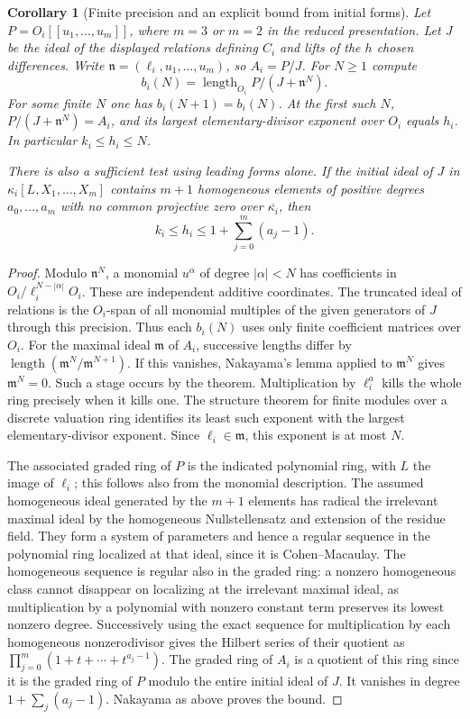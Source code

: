 \documentclass[a4paper,11pt]{article}
\newtheorem{corollary}[proposition]{Corollary}
\theoremstyle{definition}
\theoremstyle{remark}
\numberwithin{equation}{section}
\begin{document}
\begin{corollary}[Finite precision and an explicit bound from initial forms]\leavevmode
\label{cor:jetslength490}
Let \(P=O_i[[u_1,\ldots,u_m]]\), where \(m=3\) or \(m=2\) in
the reduced presentation. Let \(J\) be the ideal of the displayed
relations defining \(C_i\) and lifts of the \(h\) chosen differences.
Write \(\mathfrak n=(\ell_i,u_1,\ldots,u_m)\), so \(A_i=P/J\).
For \(N\ge1\) compute
\[
       b_i(N)=\operatorname{length}_{O_i}P/(J+\mathfrak n^N).
\]
For some finite \(N\) one has \(b_i(N+1)=b_i(N)\).
At the first such \(N\), \(P/(J+\mathfrak n^N)=A_i\), and its
largest elementary-divisor exponent over \(O_i\) equals \(h_i\).
In particular \(k_i\le h_i\le N\).

There is also a sufficient test using leading forms alone. If the
initial ideal of \(J\) in \(\kappa_i[L,X_1,\ldots,X_m]\) contains
\(m+1\) homogeneous elements of positive degrees \(a_0,\ldots,a_m\)
with no common projective zero over \(\overline{\kappa_i}\), then
\[
                  k_i\le h_i\le 1+\sum_{j=0}^m(a_j-1).
\]
\end{corollary}
\begin{proof}
Modulo \(\mathfrak n^N\), a monomial \(u^\alpha\) of degree
\(|\alpha|<N\) has coefficients in \(O_i/\ell_i^{N-|\alpha|}O_i\).
These are independent additive coordinates. The truncated ideal
of relations is the \(O_i\)-span of all monomial multiples of
the given generators of \(J\) through this precision. Thus each
\(b_i(N)\) uses only finite coefficient matrices over \(O_i\).
For the maximal ideal \(\mathfrak m\) of \(A_i\), successive
lengths differ by \(\operatorname{length}(\mathfrak m^N/
\mathfrak m^{N+1})\). If this vanishes, Nakayama's lemma applied to
\(\mathfrak m^N\) gives \(\mathfrak m^N=0\). Such a stage occurs
by the theorem. Multiplication by \(\ell_i^a\) kills the whole ring
precisely when it kills one. The structure theorem for finite
modules over a discrete valuation ring identifies its least such
exponent with the largest elementary-divisor exponent. Since
\(\ell_i\in\mathfrak m\), this exponent is at most \(N\).

The associated graded ring of \(P\) is the indicated polynomial
ring, with \(L\) the image of \(\ell_i\); this follows also from
the monomial description. The assumed homogeneous ideal generated
by the \(m+1\) elements has radical the irrelevant maximal ideal
by the homogeneous Nullstellensatz and extension of the residue
field. They form a system of parameters and hence a regular
sequence in the polynomial ring localized at that ideal, since it
is Cohen--Macaulay. The homogeneous sequence is regular also in
the graded ring: a nonzero homogeneous class cannot disappear on
localizing at the irrelevant maximal ideal, as multiplication
by a polynomial with nonzero constant term preserves its lowest
nonzero degree. Successively using the exact sequence for
multiplication by each homogeneous nonzerodivisor gives the
Hilbert series of their quotient as
\(\prod_{j=0}^m(1+t+\cdots+t^{a_j-1})\). The graded ring of
\(A_i\) is a quotient of this ring since it is the graded ring
of \(P\) modulo the entire initial ideal of \(J\).
It vanishes in degree \(1+\sum_j(a_j-1)\). Nakayama as above
proves the bound.
\end{proof}
\end{document}

